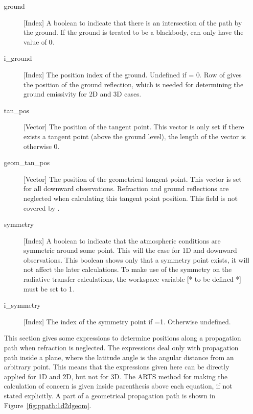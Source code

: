 \begin{description}
  \item[ground] [Index] A boolean to indicate that there is an intersection
     of the path by the ground. If the ground is treated to be a blackbody,
      can only have the value of 0.
     
   \item[i\_ground] [Index] The position index of the ground.
     Undefined if  = 0. Row  of
      gives the position of the ground reflection, which
     is needed for determining the ground emissivity for 2D and 3D cases.
     
   \item[tan\_pos] [Vector] The position of the tangent point. This
     vector is only set if there exists a tangent point (above the
     ground level), the length of the vector is otherwise 0.
     
   \item[geom\_tan\_pos] [Vector] The position of the geometrical
     tangent point. This vector is set for all downward observations.
     Refraction and ground reflections are neglected when calculating
     this tangent point position. This field is not covered by
     .
     
    \item[symmetry] [Index] A boolean to indicate that the atmospheric
      conditions are symmetric around some point. This will the case
      for 1D and downward observations. This boolean shows only that a
      symmetry point exists, it will not affect the later
      calculations.  To make use of the symmetry on the radiative
      transfer calculations, the workspace variable [* to be defined
      *] must be set to 1.

   \item[i\_symmetry] [Index] The index of the symmetry point if 
     =1. Otherwise undefined.

\end{description}




\label{sec:ppath:basicgeom}

This section gives some expressions to determine positions along a
propagation path when refraction is neglected. The expressions deal
only with propagation path inside a plane, where the latitude angle is
the angular distance from an arbitrary point. This means that the
expressions given here can be directly applied for 1D and 2D, but not for
3D. The ARTS method for making the calculation of concern is given
inside parenthesis above each equation, if not stated explicitly. A
part of a geometrical propagation path is shown in
Figure~\ref{fig:ppath:1d2dgeom}.

